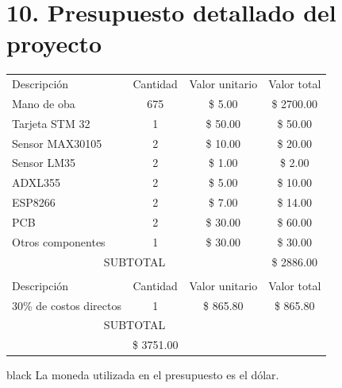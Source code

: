\documentclass[11pt]{charter}
\begin{document}
\section{10. Presupuesto detallado del proyecto}
\label{sec:presupuesto}
\begin{table}[htpb]
\centering
\begin{tabularx}{\linewidth}{@{}|X|c|r|r|@{}}
\hline
\rowcolor[HTML]{C0C0C0} 
\multicolumn{4}{|c|}{\cellcolor[HTML]{C0C0C0}COSTOS DIRECTOS} \\ \hline
\rowcolor[HTML]{C0C0C0} 
Descripción &
  \multicolumn{1}{c|}{\cellcolor[HTML]{C0C0C0}Cantidad} &
  \multicolumn{1}{c|}{\cellcolor[HTML]{C0C0C0}Valor unitario} &
  \multicolumn{1}{c|}{\cellcolor[HTML]{C0C0C0}Valor total} \\ \hline
Mano de oba  &
  \multicolumn{1}{c|}{675} &
  \multicolumn{1}{c|}{\$ 5.00} &
  \multicolumn{1}{c|}{\$ 2700.00} \\ \hline
Tarjeta STM 32  &
  \multicolumn{1}{c|}{1} &
  \multicolumn{1}{c|}{\$ 50.00} &
  \multicolumn{1}{c|}{\$ 50.00} \\ \hline
Sensor MAX30105 &
  \multicolumn{1}{c|}{2} &
  \multicolumn{1}{c|}{\$ 10.00} &
  \multicolumn{1}{c|}{\$ 20.00} \\ \hline
Sensor LM35 &
  \multicolumn{1}{c|}{2} &
  \multicolumn{1}{c|}{\$ 1.00} &
  \multicolumn{1}{c|}{\$ 2.00} \\ \hline
ADXL355 &
  \multicolumn{1}{c|}{2} &
  \multicolumn{1}{c|}{\$ 5.00} &
  \multicolumn{1}{c|}{\$ 10.00} \\ \hline
ESP8266 &
  \multicolumn{1}{c|}{2} &
  \multicolumn{1}{c|}{\$ 7.00} &
  \multicolumn{1}{c|}{\$ 14.00} \\ \hline
PCB &
  \multicolumn{1}{c|}{2} &
  \multicolumn{1}{c|}{\$ 30.00} &
  \multicolumn{1}{c|}{\$ 60.00} \\ \hline
Otros componentes &
  \multicolumn{1}{c|}{1} &
  \multicolumn{1}{c|}{\$ 30.00} &
  \multicolumn{1}{c|}{\$ 30.00} \\ \hline
\multicolumn{3}{|c|}{SUBTOTAL} &
  \multicolumn{1}{c|}{\$ 2886.00} \\ \hline
\rowcolor[HTML]{C0C0C0} 
\multicolumn{4}{|c|}{\cellcolor[HTML]{C0C0C0}COSTOS INDIRECTOS} \\ \hline
\rowcolor[HTML]{C0C0C0} 
Descripción &
  \multicolumn{1}{c|}{\cellcolor[HTML]{C0C0C0}Cantidad} &
  \multicolumn{1}{c|}{\cellcolor[HTML]{C0C0C0}Valor unitario} &
  \multicolumn{1}{c|}{\cellcolor[HTML]{C0C0C0}Valor total} \\ \hline
30\% de costos directos &
  \multicolumn{1}{c|}{1} &
  \multicolumn{1}{c|}{\$ 865.80} &
  \multicolumn{1}{c|}{\$ 865.80} \\ \hline
\multicolumn{3}{|c|}{SUBTOTAL} &
  \multicolumn{1}{c|}{} \\ \hline
\rowcolor[HTML]{C0C0C0}
\multicolumn{3}{|c|}{TOTAL} & \$ 3751.00
   \\ \hline
\end{tabularx}%
\end{table}
\vspace{10px}
\begin{consigna}{black}
La moneda utilizada en el presupuesto es el dólar.
\end{consigna}
\end{document}
